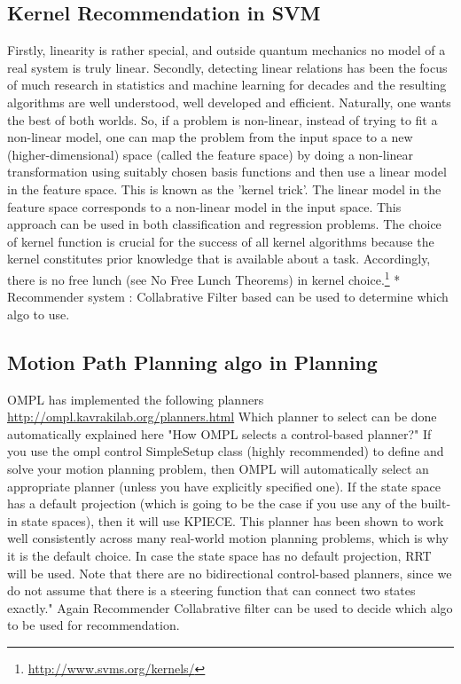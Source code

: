 \subsection{Kernel Recommendation in SVM}
Firstly, linearity is rather special, and outside quantum mechanics no
      model of a real system is truly linear. Secondly, detecting linear
relations has been the focus of much research in statistics and machine
learning for decades and the resulting algorithms are well understood, well
developed and efficient. Naturally, one wants the best of both worlds. So, if a
problem is non-linear, instead of trying to fit a non-linear model, one can map
the problem from the input space to a new (higher-dimensional) space (called
the feature space) by doing a non-linear transformation using suitably chosen
basis functions and then use a linear model in the feature space. This is known
as the 'kernel trick'. The linear model in the feature space corresponds to a
non-linear model in the input space. This approach can be used in both
classification and regression problems. The choice of kernel function is
crucial for the success of all kernel algorithms because the kernel constitutes
prior knowledge that is available about a task. Accordingly, there is no free
lunch (see No Free Lunch Theorems) in kernel choice.\footnote{\url{http://www.svms.org/kernels/}}
    * Recommender system : Collabrative Filter based can be used to determine 
which algo to use.

\subsection{Motion Path Planning algo in Planning }
     OMPL has implemented the following planners
      \url{http://ompl.kavrakilab.org/planners.html}
     Which planner to select can be done automatically explained here 
        "How OMPL selects a control-based planner?"
If you use the ompl control SimpleSetup class (highly recommended) to define
and solve your motion planning problem, then OMPL will automatically select an
appropriate planner (unless you have explicitly specified one). If the state
space has a default projection (which is going to be the case if you use any of
the built-in state spaces), then it will use KPIECE. This planner has been
shown to work well consistently across many real-world motion planning
problems, which is why it is the default choice. In case the state space has no
default projection, RRT will be used. Note that there are no bidirectional
control-based planners, since we do not assume that there is a steering
function that can connect two states exactly."
     Again Recommender Collabrative filter can be used to decide which algo to
      be used for recommendation.

